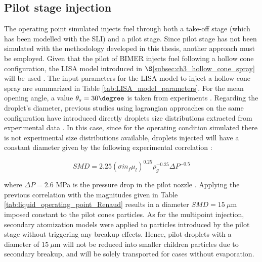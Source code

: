 %




\subsection{Pilot stage injection}

The operating point simulated injects fuel through both a take-off stage (which has been modelled with the SLI) and a pilot stage. Since pilot stage has not been simulated with the methodology developed in this thesis, another approach must be employed. Given that the pilot of BIMER injects fuel following a hollow cone configuration, the LISA model introduced in $\S$\ref{subsec:ch3_hollow_cone_spray} will be used .   The input parameters for the LISA model to inject a hollow cone spray are summarized in Table \ref{tab:LISA_model_parameters}. For the mean opening angle, a value $\theta_s = 30 \degree$ is taken from experiments . Regarding the droplet's diameter, previous studies using lagrangian approaches on the same configuration have introduced directly droplets size distributions extracted from experimental data . In this case, since for the operating condition simulated there is not experimental size distributions available, droplets injected will have a constant diameter given by the following experimental correlation :

\begin{equation}
SMD = 2.25 \left( \sigma \dot{m}_f \mu_l \right)^{0.25} \rho_g^{-0.25}  \Delta P^{-0.5}
\end{equation}

where $\Delta P = 2.6$ MPa is the pressure drop in the pilot nozzle . Applying the previous correlation with the magnitudes given in Table \ref{tab:liquid_operating_point_Renaud} results in a diameter $SMD = 15~\mu$m imposed constant to the pilot cones particles. As for the multipoint injection, secondary atomization models were applied to  particles introduced by the pilot stage without triggering any breakup effects. Hence, pilot droplets with a diameter of $15~\mu$m will not be reduced into smaller children particles due to secondary breakup, and will be solely transported for cases without evaporation. 

